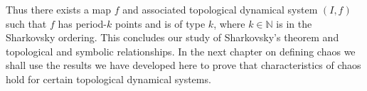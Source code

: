 Thus there exists a map $f$ and associated topological dynamical system $(I, f)$ such that $f$ has period-$k$ points and is of type $k$, where $k \in \mathbb{N}$ is in the Sharkovsky ordering. This concludes our study of Sharkovsky's theorem and topological and symbolic relationships. In the next chapter on defining chaos we shall use the results we have developed here to prove that characteristics of chaos hold for certain topological dynamical systems.
